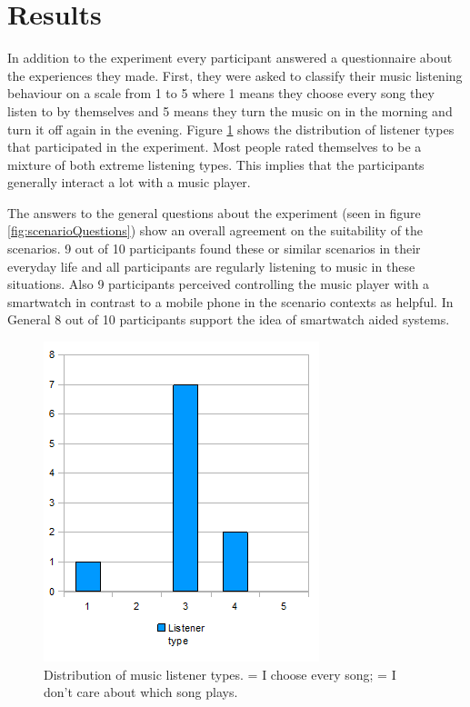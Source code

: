 \section{Results}\label{sec:studyResults}
In addition to the experiment every participant answered a questionnaire about the experiences they made. First, they were asked to classify their music listening behaviour on a scale from 1 to 5 where 1 means they choose every song they listen to by themselves and 5 means they turn the music on in the morning and turn it off again in the evening. Figure \ref{fig:listenerTypes} shows the distribution of listener types that participated in the experiment. Most people rated themselves to be a mixture of both extreme listening types. This implies that the participants generally interact a lot with a music player.

The answers to the general questions about the experiment (seen in figure \ref{fig:scenarioQuestions}) show an overall agreement on the suitability of the scenarios. 9 out of 10 participants found these or similar scenarios in their everyday life and all participants are regularly listening to music in these situations. Also 9 participants perceived controlling the music player with a smartwatch in contrast to a mobile phone in the scenario contexts as helpful. In General 8 out of 10 participants support the idea of smartwatch aided systems.

\begin{figure}[bth]
	\myfloatalign
	\label{fig:listenerTypes}
	\includegraphics[width=.5\linewidth]{img/listenerTypesPlot.png}
	\caption{Distribution of music listener types.  = I choose every song;  = I don't care about which song plays.}
\end{figure}

